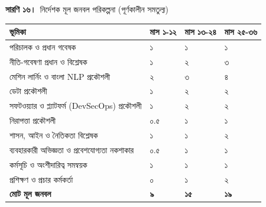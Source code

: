 \documentclass[border=10pt]{standalone}
\begin{document}
\begin{minipage}{17cm}
{\large\bfseries সারণি ১৬।}\ {\large নির্দেশক মূল জনবল পরিকল্পনা (পূর্ণকালীন সমতুল্য)}\par\vspace{7pt}
\small
{}
\begin{tabularx}{\linewidth}{@{}>{\hsize=2.000\hsize\raggedright\arraybackslash}X>{\hsize=0.667\hsize\raggedright\arraybackslash}X>{\hsize=0.667\hsize\raggedright\arraybackslash}X>{\hsize=0.667\hsize\raggedright\arraybackslash}X@{}}
\arrayrulecolor{bapilrule}\toprule
\rowcolor{white}\textbf{ভূমিকা} & \textbf{মাস ১-১২} & \textbf{মাস ১৩-২৪} & \textbf{মাস ২৫-৩৬} \\
\midrule
পরিচালক ও প্রধান গবেষক & ১ & ১ & ১ \\
নীতি-গবেষণা প্রধান ও বিশ্লেষক & ১ & ২ & ৩ \\
মেশিন লার্নিং ও বাংলা NLP প্রকৌশলী & ২ & ৩ & ৪ \\
ডেটা প্রকৌশলী & ১ & ২ & ২ \\
সফটওয়্যার ও প্ল্যাটফর্ম (DevSecOps) প্রকৌশলী & ১ & ২ & ২ \\
নিরাপত্তা প্রকৌশলী & ০.৫ & ১ & ১ \\
শাসন, আইন ও নৈতিকতা বিশ্লেষক & ১ & ১ & ২ \\
ব্যবহারকারী অভিজ্ঞতা ও প্রবেশযোগ্যতা নকশাকার & ০.৫ & ১ & ১ \\
কর্মসূচি ও অংশীদারিত্ব সমন্বয়ক & ১ & ১ & ১ \\
প্রশিক্ষণ ও প্রচার কর্মকর্তা & ০ & ১ & ২ \\
\textbf{মোট মূল জনবল} & \textbf{৯} & \textbf{১৫} & \textbf{১৯} \\
\bottomrule
\end{tabularx}
\par\vspace{5pt}{\footnotesize\itshape খণ্ডকালীন ERRC সদস্য, উপদেষ্টা, অতিথি ফেলো ও স্নাতকোত্তর শিক্ষার্থী অন্তর্ভুক্ত নয়। নির্দেশক ব্যয় সারণি ৪৯-এ; চূড়ান্ত ব্যয় সম্ভাব্যতা সমীক্ষায় (D1.3) নির্ধারিত হবে।}
\par{}
\end{minipage}
\end{document}
